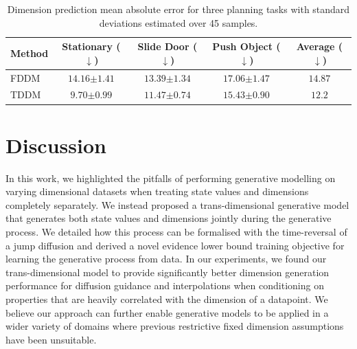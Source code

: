 \begin{table}[h]
     \centering
   \caption{Dimension prediction mean absolute error for three planning tasks with standard deviations estimated over 45 samples.}
   \begin{tabular}{@{}lcccc@{}}
     \toprule
     Method & Stationary ($\downarrow$) & Slide Door ($\downarrow$) & Push Object ($\downarrow$) & Average ($\downarrow$)   \\ \midrule
     FDDM & $14.16 {\scriptstyle \pm 1.41}$ & $13.39 {\scriptstyle \pm 1.34}$ & $17.06 {\scriptstyle \pm 1.47}$ & $14.87$ \\
     TDDM & $\mathbf{9.70 {\scriptstyle \pm 0.99}}$ & $\mathbf{11.47 {\scriptstyle \pm 0.74}}$ & $\mathbf{15.43 {\scriptstyle \pm 0.90}}$ & $\mathbf{12.2}$ \\ \bottomrule
   \end{tabular}
   \label{tab:video_results}
\end{table}


\section{Discussion}
In this work, we highlighted the pitfalls of performing generative modelling on varying dimensional datasets when treating state values and dimensions completely separately. We instead proposed a trans-dimensional generative model that generates both state values and dimensions jointly during the generative process. We detailed how this process can be formalised with the time-reversal of a jump diffusion and derived a novel evidence lower bound training objective for learning the generative process from data. In our experiments, we found our trans-dimensional model to provide significantly better dimension generation performance for  diffusion guidance and interpolations when conditioning on properties that are heavily correlated with the dimension of a datapoint. We believe our approach can further enable generative models to be applied in a wider variety of domains where previous restrictive fixed dimension assumptions have been unsuitable.